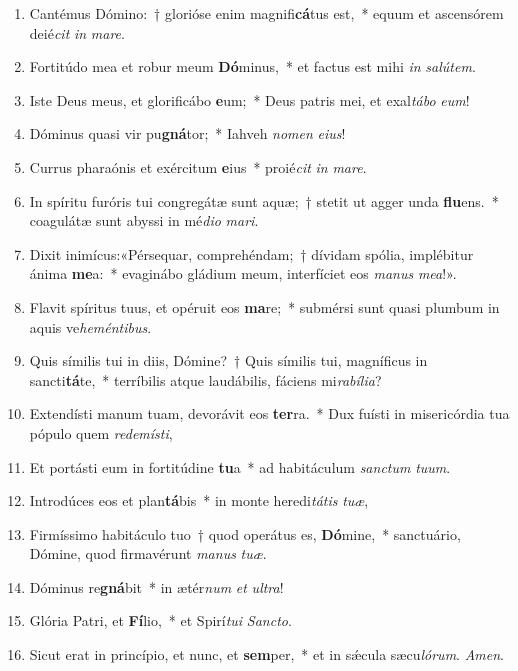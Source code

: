 \documentclass[twoside]{article}
\begin{document}
\begin{paracol}[1]{2}
\begin{enumerate}[wide, itemsep=0mm, labelwidth=!, labelindent=0pt, label=\color{gregoriocolor}\theenumi]
\item Cantémus Dómino:~† glorióse enim magnifi\textbf{cá}tus est,~* equum et ascensórem deié\textit{cit} \textit{in} \textit{ma}\textit{re}.
\item Fortitúdo mea et robur meum \textbf{Dó}minus,~* et factus est mihi \textit{in} \textit{sa}\textit{lú}\textit{tem}.
\item Iste Deus meus, et glorificábo \textbf{e}um;~* Deus patris mei, et exal\textit{tá}\textit{bo} \textit{e}\textit{um}!
\item Dóminus quasi vir pu\textbf{gná}tor;~* Iahveh \textit{no}\textit{men} \textit{e}\textit{ius}!
\item Currus pharaónis et exércitum \textbf{e}ius~* proié\textit{cit} \textit{in} \textit{ma}\textit{re}.
\item In spíritu furóris tui congregátæ sunt aquæ;~† stetit ut agger unda \textbf{flu}ens.~* coagulátæ sunt abyssi in mé\textit{di}\textit{o} \textit{ma}\textit{ri}.
\item Dixit inimícus:«Pérsequar, comprehéndam;~† dívidam spólia, implébitur ánima \textbf{me}a:~* evaginábo gládium meum, interfíciet eos \textit{ma}\textit{nus} \textit{me}\textit{a}!».
\item Flavit spíritus tuus, et opéruit eos \textbf{ma}re;~* submérsi sunt quasi plumbum in aquis ve\textit{he}\textit{mén}\textit{ti}\textit{bus}.
\item Quis símilis tui in diis, Dómine?~† Quis símilis tui, magníficus in sancti\textbf{tá}te,~* terríbilis atque laudábilis, fáciens mi\textit{ra}\textit{bí}\textit{li}\textit{a}?
\item Extendísti manum tuam, devorávit eos \textbf{ter}ra.~* Dux fuísti in misericórdia tua pópulo quem \textit{red}\textit{e}\textit{mís}\textit{ti},
\item Et portásti eum in fortitúdine \textbf{tu}a~* ad habitáculum \textit{sanc}\textit{tum} \textit{tu}\textit{um}.
\item Introdúces eos et plan\textbf{tá}bis~* in monte heredi\textit{tá}\textit{tis} \textit{tu}\textit{æ},
\item Firmíssimo habitáculo tuo~† quod operátus es, \textbf{Dó}mine,~* sanctuário, Dómine, quod firmavérunt \textit{ma}\textit{nus} \textit{tu}\textit{æ}.
\item Dóminus re\textbf{gná}bit~* in ætér\textit{num} \textit{et} \textit{ul}\textit{tra}!
\item Glória Patri, et \textbf{Fí}lio,~* et Spirí\textit{tu}\textit{i} \textit{Sanc}\textit{to}.
\item Sicut erat in princípio, et nunc, et \textbf{sem}per,~* et in sǽcula sæcu\textit{ló}\textit{rum}. \textit{A}\textit{men}.
\end{enumerate}


\end{paracol}
\end{document}
